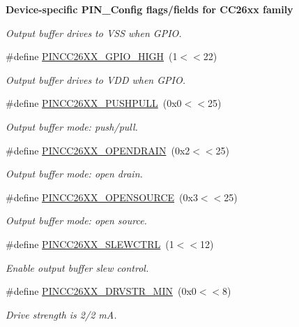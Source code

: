 \begin{Indent}{\bf Device-\/specific P\+I\+N\+\_\+\+Config flags/fields for C\+C26xx family}
\begin{DoxyCompactItemize}
\begin{DoxyCompactList}\small\item\em Output buffer drives to V\+S\+S when G\+P\+I\+O. \end{DoxyCompactList}\item 
\#define \hyperlink{_p_i_n_c_c26_x_x_8h_a92176ec67c16a6b11ba4a809c034656c}{P\+I\+N\+C\+C26\+X\+X\+\_\+\+G\+P\+I\+O\+\_\+\+H\+I\+G\+H}~(1$<$$<$22)
\begin{DoxyCompactList}\small\item\em Output buffer drives to V\+D\+D when G\+P\+I\+O. \end{DoxyCompactList}\item 
\#define \hyperlink{_p_i_n_c_c26_x_x_8h_a49e505c85c98df6615dcb287991d305b}{P\+I\+N\+C\+C26\+X\+X\+\_\+\+P\+U\+S\+H\+P\+U\+L\+L}~(0x0$<$$<$25)
\begin{DoxyCompactList}\small\item\em Output buffer mode\+: push/pull. \end{DoxyCompactList}\item 
\#define \hyperlink{_p_i_n_c_c26_x_x_8h_a853703ea7b1f0e256971d0004bb9253c}{P\+I\+N\+C\+C26\+X\+X\+\_\+\+O\+P\+E\+N\+D\+R\+A\+I\+N}~(0x2$<$$<$25)
\begin{DoxyCompactList}\small\item\em Output buffer mode\+: open drain. \end{DoxyCompactList}\item 
\#define \hyperlink{_p_i_n_c_c26_x_x_8h_a78cb87ea41dd5c40b02f91f118e8782a}{P\+I\+N\+C\+C26\+X\+X\+\_\+\+O\+P\+E\+N\+S\+O\+U\+R\+C\+E}~(0x3$<$$<$25)
\begin{DoxyCompactList}\small\item\em Output buffer mode\+: open source. \end{DoxyCompactList}\item 
\#define \hyperlink{_p_i_n_c_c26_x_x_8h_ab6336729706993f8423acf026dd7e9c0}{P\+I\+N\+C\+C26\+X\+X\+\_\+\+S\+L\+E\+W\+C\+T\+R\+L}~(1$<$$<$12)
\begin{DoxyCompactList}\small\item\em Enable output buffer slew control. \end{DoxyCompactList}\item 
\#define \hyperlink{_p_i_n_c_c26_x_x_8h_abb5efea898dfb62cd3723c9c106c7ee9}{P\+I\+N\+C\+C26\+X\+X\+\_\+\+D\+R\+V\+S\+T\+R\+\_\+\+M\+I\+N}~(0x0$<$$<$8)
\begin{DoxyCompactList}\small\item\em Drive strength is 2/2 m\+A. \end{DoxyCompactList}\item 

\end{DoxyCompactItemize}
\end{Indent}
